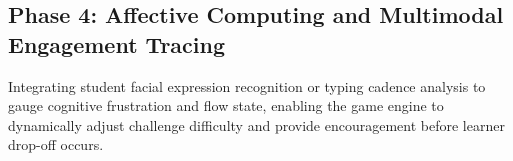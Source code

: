 \subsection{Phase 4: Affective Computing and Multimodal Engagement Tracing}
Integrating student facial expression recognition or typing cadence analysis to gauge cognitive frustration and flow state, enabling the game engine to dynamically adjust challenge difficulty and provide encouragement before learner drop-off occurs.

